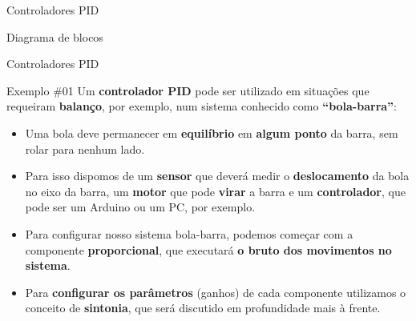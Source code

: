 \begin{frame}{Controladores PID}
	\centering
	
	\bigskip
	
	Diagrama de blocos
\end{frame}


\begin{frame}{Controladores PID}
	\begin{block}{Exemplo \#01}
		Um \textbf{controlador PID} pode ser utilizado em situações que requeiram \textbf{balanço}, por exemplo, num sistema conhecido como \textbf{``bola-barra''}:
		\begin{itemize}
			\item Uma bola deve permanecer em \textbf{equilíbrio} em \textbf{algum ponto} da barra, sem rolar para nenhum lado.
			\item Para isso dispomos de um \textbf{sensor} que deverá medir o \textbf{deslocamento} da bola no eixo da barra, um \textbf{motor} que pode \textbf{virar} a barra e um \textbf{controlador}, que pode ser um Arduino ou um PC, por exemplo.
			\item Para configurar nosso sistema bola-barra, podemos começar com a componente \textbf{proporcional}, que executará \textbf{o bruto dos movimentos no sistema}.
			\item Para \textbf{configurar os parâmetros} (ganhos) de cada componente utilizamos o conceito de \textbf{sintonia}, que será discutido em profundidade mais à frente.
		\end{itemize}
	\end{block}
\end{frame}


